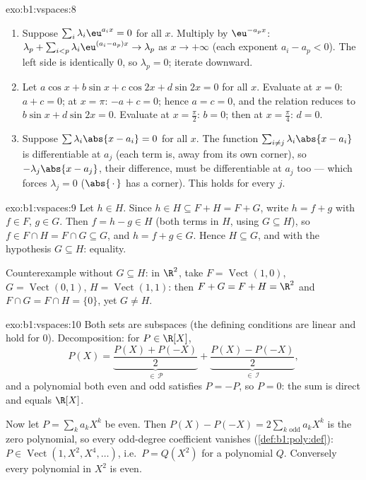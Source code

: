 \begin{solution}{exo:b1:vspaces:8}
\begin{enumerate}
  \item Suppose $\sum_{i} \lambda_i \eu^{a_i x} = 0$ for all $x$.
        Multiply by $\eu^{-a_p x}$: $\lambda_p + \sum_{i < p}
        \lambda_i \eu^{(a_i - a_p)x} \to \lambda_p$ as $x \to
        +\infty$ (each exponent $a_i - a_p < 0$). The left side is
        identically $0$, so $\lambda_p = 0$; iterate downward.
  \item Let $a\cos x + b \sin x + c \cos 2x + d\sin 2x = 0$ for all
        $x$. Evaluate at $x = 0$: $a + c = 0$; at $x = \pi$: $-a + c
        = 0$; hence $a = c = 0$, and the relation reduces to $b\sin
        x + d \sin 2x = 0$. Evaluate at $x = \frac\pi2$: $b = 0$;
        then at $x = \frac\pi4$: $d = 0$.
  \item Suppose $\sum \lambda_i \abs{x - a_i} = 0$ for all $x$. The
        function $\sum_{i \neq j} \lambda_i\abs{x - a_i}$ is
        differentiable at $a_j$ (each term is, away from its own
        corner), so $-\lambda_j \abs{x - a_j}$, their difference,
        must be differentiable at $a_j$ too --- which forces
        $\lambda_j = 0$ ($\abs{\,\cdot\,}$ has a corner). This holds
        for every $j$.
\end{enumerate}
\end{solution}

\begin{solution}{exo:b1:vspaces:9}
Let $h \in H$. Since $h \in H \subseteq F + H = F + G$, write $h = f
+ g$ with $f \in F$, $g \in G$. Then $f = h - g \in H$ (both terms
in $H$, using $G \subseteq H$), so $f \in F \cap H = F \cap G
\subseteq G$, and $h = f + g \in G$. Hence $H \subseteq G$, and with
the hypothesis $G \subseteq H$: equality.

Counterexample without $G \subseteq H$: in $\R^2$, take $F =
\operatorname{Vect}(1,0)$, $G = \operatorname{Vect}(0,1)$, $H =
\operatorname{Vect}(1,1)$: then $F + G = F + H = \R^2$ and $F \cap G
= F \cap H = \{0\}$, yet $G \neq H$.
\end{solution}

\begin{solution}{exo:b1:vspaces:10}
Both sets are subspaces (the defining conditions are linear and
hold for $0$). Decomposition: for $P \in \R[X]$,
\[
P(X) = \underbrace{\frac{P(X) + P(-X)}{2}}_{\in\,\mathcal P}
+ \underbrace{\frac{P(X) - P(-X)}{2}}_{\in\,\mathcal I},
\]
and a polynomial both even and odd satisfies $P = -P$, so $P = 0$:
the sum is direct and equals $\R[X]$.

Now let $P = \sum_k a_k X^k$ be even. Then $P(X) - P(-X) = 2
\sum_{k \text{ odd}} a_k X^k$ is the zero polynomial, so every
odd-degree coefficient vanishes (\cref{def:b1:poly:def}): $P \in
\operatorname{Vect}(1, X^2, X^4, \dots)$, i.e.\ $P = Q(X^2)$ for a
polynomial $Q$. Conversely every polynomial in $X^2$ is even.
\end{solution}

